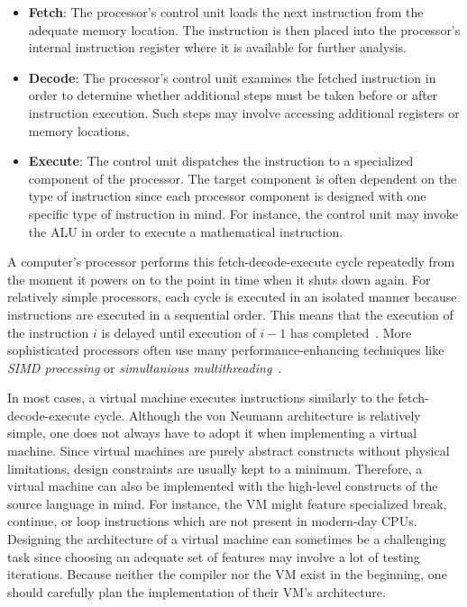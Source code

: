 \begin{itemize}
	\item \textbf{Fetch}: The processor's control unit loads the next instruction from the adequate memory location.
	      The instruction is then placed into the processor's internal instruction register where it is available for further analysis.
	\item \textbf{Decode}:
	      The processor's control unit examines the fetched instruction in order to determine whether additional steps must be taken before or after instruction execution.
	      Such steps may involve accessing additional registers or memory locations.
	\item \textbf{Execute}:
	      The control unit dispatches the instruction to a specialized component of the processor.
	      The target component is often dependent on the type of instruction since each processor component is designed with one specific type of instruction in mind.
	      For instance, the control unit may invoke the ALU in order to execute a mathematical instruction.
\end{itemize}

A computer's processor performs this fetch-decode-execute cycle repeatedly from the moment it powers on to the point in time when it shuts down again.
For relatively simple processors, each cycle is executed in an isolated manner because instructions are executed in a sequential order.
This means that the execution of the instruction $i$ is delayed until execution of $i - 1$ has completed~\cite[pp.~208-209]{Ledin2020-yp}.
More sophisticated processors often use many performance-enhancing techniques like \emph{SIMD processing} or \emph{simultanious multithreading}~\cite[pp.~217f.]{Ledin2020-yp}.

In most cases, a virtual machine executes instructions similarly to the fetch-decode-execute cycle.
Although the von Neumann architecture is relatively simple, one does not always have to adopt it when implementing a virtual machine.
Since virtual machines are purely abstract constructs without physical limitations, design constraints are usually kept to a minimum.
Therefore, a virtual machine can also be implemented with the high-level constructs of the source language in mind.
For instance, the VM might feature specialized break, continue, or loop instructions which are not present in modern-day CPUs.
Designing the architecture of a virtual machine can sometimes be a challenging task since choosing an adequate set of features may involve a lot of testing iterations.
Because neither the compiler nor the VM exist in the beginning, one should carefully plan the implementation of their VM's architecture.

